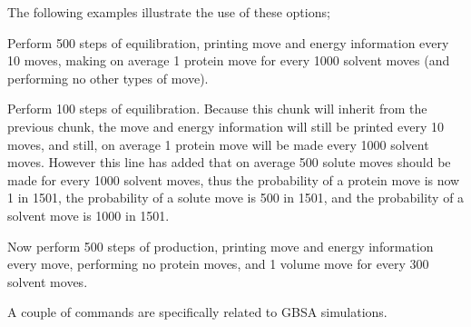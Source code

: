 \documentclass[letterpaper,10pt,english]{sphinxmanual}
\begin{document}
The following examples illustrate the use of these options;

%
\begin{sphinxVerbatim}[commandchars=\\\{\}]
      
\end{sphinxVerbatim}

Perform 500 steps of equilibration, printing move and energy information every 10 moves, making on average 1 protein move for every 1000 solvent moves (and performing no other types of move).

%
\begin{sphinxVerbatim}[commandchars=\\\{\}]
   
\end{sphinxVerbatim}

Perform 100 steps of equilibration. Because this chunk will inherit from the previous chunk, the move and energy information will still be printed every 10 moves, and still, on average 1 protein move will be made every 1000 solvent moves. However this line has added that on average 500 solute moves should be made for every 1000 solvent moves, thus the probability of a protein move is now 1 in 1501, the probability of a solute move is 500 in 1501, and the probability of a solvent move is 1000 in 1501.

%
\begin{sphinxVerbatim}[commandchars=\\\{\}]
      
\end{sphinxVerbatim}

Now perform 500 steps of production, printing move and energy information every move, performing no protein moves, and 1 volume move for every 300 solvent moves.

A couple of  commands are specifically related to GBSA simulations.

\ignorespaces 
\def\sphinxLiteralBlockLabel{\label{\detokenize{protoms:index-71}}}
%
\begin{sphinxVerbatim}[commandchars=\\\{\}]
     
\end{sphinxVerbatim}
\end{document}
